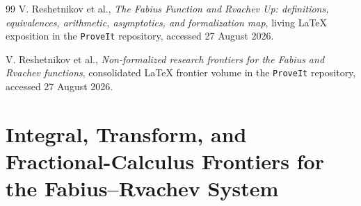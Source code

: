 \documentclass[11pt,oneside]{article}
\newcommand{\integrationreportreset}{%
  \clearpage
  \setcounter{section}{0}%
  \renewcommand{\thesection}{\arabic{section}}}
\theoremstyle{definition}
\theoremstyle{remark}
\newcommand{\1}{\mathbf 1}
\begin{document}
\begin{thebibliography}{99}
V. Reshetnikov et al.,
\newblock \emph{The Fabius Function and Rvachev Up: definitions, equivalences, arithmetic,
asymptotics, and formalization map},
\newblock living LaTeX exposition in the \texttt{ProveIt} repository, accessed 27 August 2026.

V. Reshetnikov et al.,
\newblock \emph{Non-formalized research frontiers for the Fabius and Rvachev functions},
\newblock consolidated LaTeX frontier volume in the \texttt{ProveIt} repository, accessed
27 August 2026.

\end{thebibliography}


\newcommand{\sincPartll}{\operatorname{sinc}}
\newcommand{\pv}{\operatorname{p.v.}}
\newcommand{\risingPartll}[2]{(#1)_{#2}}
\newcommand{\BetaInc}{\mathrm B}
\newcommand{\Gammaf}{\Gamma}
\newcommand{\FourierPartll}{\mathcal F}
\newcommand{\RLInt}[1]{I_{0+}^{#1}}
\newcommand{\RLIntm}[1]{I_{-1+}^{#1}}
\newcommand{\RLDer}[1]{D_{0+}^{#1}}
\newcommand{\CapDer}[1]{{}^{\mathrm C}\!D_{0+}^{#1}}
\newcommand{\RieszDer}[1]{D_{\mathrm R}^{#1}}
\newcommand{\QF}{Q}
\newcommand{\statusbackground}{\textcolor{linkblue}{\textbf{Background / corpus result.}}}
\newcommand{\statusprovedPartll}{\textcolor{proofgreen}{\textbf{Proved in this report.}}}
\newcommand{\statusconditional}{\textcolor{conditionalorange}{\textbf{Conditional statement.}}}
\newcommand{\statusconjecture}{\textcolor{conjecturered}{\textbf{Conjectural.}}}

\integrationreportreset
\part{Integral, Transform, and Fractional-Calculus Frontiers for the Fabius--Rvachev System}
\end{document}
